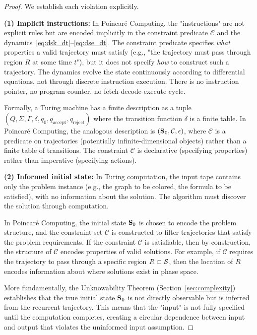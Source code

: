 \begin{proof}
We establish each violation explicitly.

\textbf{(1) Implicit instructions:} In Poincaré Computing, the "instructions" are not explicit rules but are encoded implicitly in the constraint predicate $\mathcal{C}$ and the dynamics~\eqref{eq:dsk_dt}--\eqref{eq:dse_dt}. The constraint predicate specifies \textit{what} properties a valid trajectory must satisfy (e.g., "the trajectory must pass through region $R$ at some time $t$"), but it does not specify \textit{how} to construct such a trajectory. The dynamics evolve the state continuously according to differential equations, not through discrete instruction execution. There is no instruction pointer, no program counter, no fetch-decode-execute cycle.

Formally, a Turing machine has a finite description as a tuple $(Q, \Sigma, \Gamma, \delta, q_0, q_{\text{accept}}, q_{\text{reject}})$ where the transition function $\delta$ is a finite table. In Poincaré Computing, the analogous description is $(\mathbf{S}_0, \mathcal{C}, \epsilon)$, where $\mathcal{C}$ is a predicate on trajectories (potentially infinite-dimensional objects) rather than a finite table of transitions. The constraint $\mathcal{C}$ is declarative (specifying properties) rather than imperative (specifying actions).

\textbf{(2) Informed initial state:} In Turing computation, the input tape contains only the problem instance (e.g., the graph to be colored, the formula to be satisfied), with no information about the solution. The algorithm must discover the solution through computation.

In Poincaré Computing, the initial state $\mathbf{S}_0$ is chosen to encode the problem structure, and the constraint set $\mathcal{C}$ is constructed to filter trajectories that satisfy the problem requirements. If the constraint $\mathcal{C}$ is satisfiable, then by construction, the structure of $\mathcal{C}$ encodes properties of valid solutions. For example, if $\mathcal{C}$ requires the trajectory to pass through a specific region $R \subset \mathcal{S}$, then the location of $R$ encodes information about where solutions exist in phase space.

More fundamentally, the Unknowability Theorem (Section~\ref{sec:complexity}) establishes that the true initial state $\mathbf{S}_0$ is not directly observable but is inferred from the recurrent trajectory. This means that the "input" is not fully specified until the computation completes, creating a circular dependence between input and output that violates the uninformed input assumption.


\end{proof}
